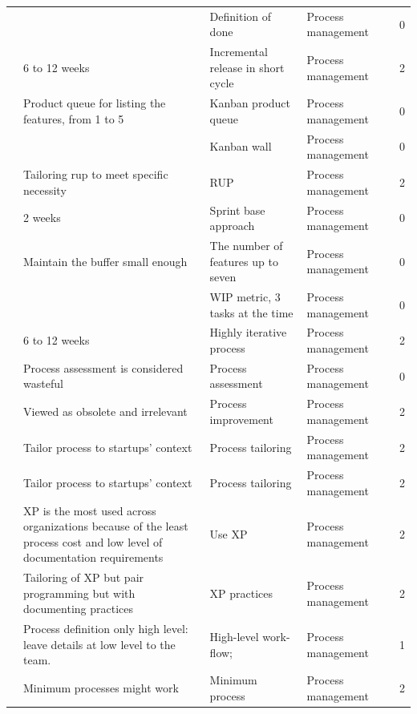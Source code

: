 \documentclass[final,5p,times,twocolumn]{elsarticle}
\begin{document}
\begin{center}
\begin{longtable}{|p{0.36in}|p{2.6in}|p{1.2in}|p{0.9in}|p{0.9in}|p{0.2in}|}
\cite{Taipale2010} &       & Definition of done & Process management &       & 0 \\
\cite{Ambler2002} & 6 to 12 weeks & Incremental release in short cycle & Process management &       & 2 \\
\cite{Taipale2010} & Product queue for listing the features, from 1 to 5 & Kanban product queue & Process management &       & 0 \\
\cite{Kuvinka2011} &       & Kanban wall & Process management &       & 0 \\
\cite{Ambler2002} & Tailoring rup to meet specific necessity & RUP   & Process management &       & 2 \\
\cite{Kuvinka2011} & 2 weeks & Sprint base approach & Process management &       & 0 \\
\cite{Taipale2010} & Maintain the buffer small enough & The number of features up to seven & Process management &       & 0 \\
\cite{Kuvinka2011} &       & WIP metric, 3 tasks at the time & Process management &       & 0 \\
\cite{Ambler2002} & 6 to 12 weeks & Highly iterative process & Process management &       & 2 \\
\cite{Fayad1997} & Process assessment is considered wasteful & Process assessment & Process management &       & 0 \\
\cite{Zettel2001} & Viewed as obsolete and irrelevant & Process improvement & Process management &       & 2 \\
\cite{Coleman2007} & Tailor process to startups' context & Process tailoring & Process management &       & 2 \\
\cite{Coleman2008} & Tailor process to startups' context & Process tailoring & Process management &       & 2 \\
\cite{Coleman2007} & XP is the most used across organizations because of the least process cost and low level of documentation requirements & Use XP & Process management &       & 2 \\
\cite{Zettel2001} & Tailoring of XP but pair programming but with documenting practices & XP practices & Process management &       & 2 \\
\cite{Sutton2000} & Process definition only high level: leave details at low level to the team. & High-level work-flow; & Process management &       & 1 \\
\cite{Coleman2008a} & Minimum processes might work & Minimum process & Process management &       & 2 \\

\end{longtable}
\end{center}
\end{document}
